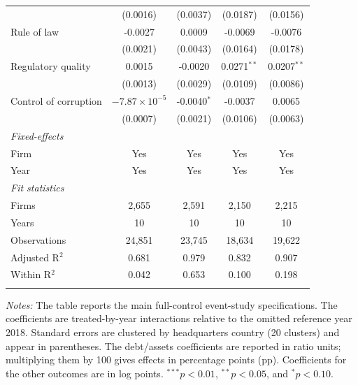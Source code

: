 \begin{table}[htbp]
\begin{tabular}{lcccc}
                              & (0.0016)        & (0.0037)        & (0.0187)         & (0.0156) \\
      Rule of law             & -0.0027         & 0.0009          & -0.0069          & -0.0076 \\
                              & (0.0021)        & (0.0043)        & (0.0164)         & (0.0178) \\
      Regulatory quality      & 0.0015          & -0.0020         & 0.0271$^{**}$    & 0.0207$^{**}$ \\
                              & (0.0013)        & (0.0029)        & (0.0109)         & (0.0086) \\
      Control of corruption   & $-7.87\times 10^{-5}$ & -0.0040$^{*}$ & -0.0037          & 0.0065 \\
                              & (0.0007)        & (0.0021)        & (0.0106)         & (0.0063) \\
      \midrule
      \emph{Fixed-effects} \\
      Firm                    & Yes              & Yes              & Yes               & Yes \\
      Year                    & Yes              & Yes              & Yes               & Yes \\
      \midrule
      \emph{Fit statistics} \\
      Firms                   & 2,655            & 2,591            & 2,150             & 2,215 \\
      Years                   & 10               & 10               & 10                & 10 \\
      Observations            & 24,851           & 23,745           & 18,634            & 19,622 \\
      Adjusted R$^2$          & 0.681            & 0.979            & 0.832             & 0.907 \\
      Within R$^2$            & 0.042            & 0.653            & 0.100             & 0.198 \\
      \midrule \midrule & \tabularnewline
   \end{tabular}

   \par \raggedright
   \textit{Notes:} The table reports the main full-control event-study specifications. The coefficients are treated-by-year interactions relative to the omitted reference year 2018. Standard errors are clustered by headquarters country (20 clusters) and appear in parentheses. The debt/assets coefficients are reported in ratio units; multiplying them by 100 gives effects in percentage points (pp). Coefficients for the other outcomes are in log points. $^{***}p<0.01$, $^{**}p<0.05$, and $^{*}p<0.10$.
\end{table}
